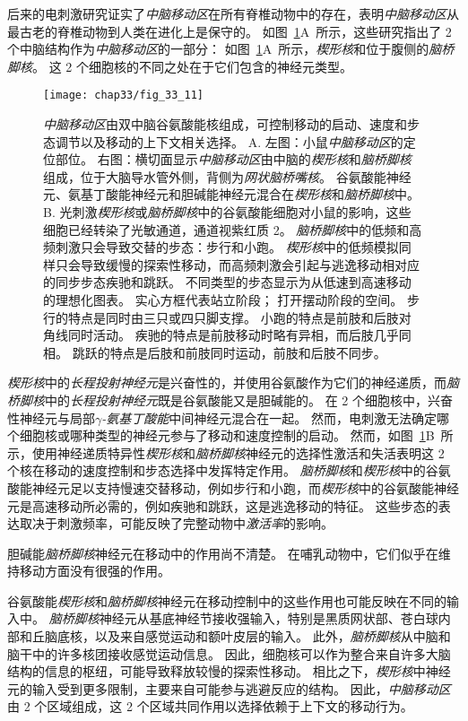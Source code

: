 后来的电刺激研究证实了\textit{中脑移动区}在所有脊椎动物中的存在，表明\textit{中脑移动区}从最古老的脊椎动物到人类在进化上是保守的。
如图~\ref{fig:33_11}A~所示，这些研究指出了 2 个中脑结构作为\textit{中脑移动区}的一部分：
如图~\ref{fig:33_11}A~所示，\textit{楔形核}和位于腹侧的\textit{脑桥脚核}。
这 2 个细胞核的不同之处在于它们包含的神经元类型。


\begin{figure}[htbp]
	\centering
	\texttt{[image: chap33/fig\_33\_11]}
	\caption{\textit{中脑移动区}由双中脑谷氨酸能核组成，可控制移动的启动、速度和步态调节以及移动的上下文相关选择。
		A. 左图：小鼠\textit{中脑移动区}的定位部位。
		右图：横切面显示\textit{中脑移动区}由中脑的\textit{楔形核}和\textit{脑桥脚核}组成，位于大脑导水管外侧，背侧为\textit{网状脑桥嘴核}。
		谷氨酸能神经元、氨基丁酸能神经元和胆碱能神经元混合在\textit{楔形核}和\textit{脑桥脚核}中。
		B. 光刺激\textit{楔形核}或\textit{脑桥脚核}中的谷氨酸能细胞对小鼠的影响，这些细胞已经转染了光敏通道，通道视紫红质 2。
		\textit{脑桥脚核}中的低频和高频刺激只会导致交替的步态：步行和小跑。
		\textit{楔形核}中的低频模拟同样只会导致缓慢的探索性移动，而高频刺激会引起与逃逸移动相对应的同步步态疾驰和跳跃。
		不同类型的步态显示为从低速到高速移动的理想化图表。
		实心方框代表站立阶段；
		打开摆动阶段的空间。
		步行的特点是同时由三只或四只脚支撑。
		小跑的特点是前肢和后肢对角线同时活动。
		疾驰的特点是前肢移动时略有异相，而后肢几乎同相。
		跳跃的特点是后肢和前肢同时运动，前肢和后肢不同步\cite{caggiano2018midbrain}。}
	\label{fig:33_11}
\end{figure}


\textit{楔形核}中的\textit{长程投射神经元}是兴奋性的，并使用谷氨酸作为它们的神经递质，而\textit{脑桥脚核}中的\textit{长程投射神经元}既是谷氨酸能又是胆碱能的。
在 2 个细胞核中，兴奋性神经元与局部\textit{$\gamma$-氨基丁酸能}中间神经元混合在一起。
然而，电刺激无法确定哪个细胞核或哪种类型的神经元参与了移动和速度控制的启动。
然而，如图~\ref{fig:33_11}B~所示，使用神经递质特异性\textit{楔形核}和\textit{脑桥脚核}神经元的选择性激活和失活表明这 2 个核在移动的速度控制和步态选择中发挥特定作用。
\textit{脑桥脚核}和\textit{楔形核}中的谷氨酸能神经元足以支持慢速交替移动，例如步行和小跑，而\textit{楔形核}中的谷氨酸能神经元是高速移动所必需的，例如疾驰和跳跃，这是逃逸移动的特征。
这些步态的表达取决于刺激频率，可能反映了完整动物中\textit{激活率}的影响。


胆碱能\textit{脑桥脚核}神经元在移动中的作用尚不清楚。
在哺乳动物中，它们似乎在维持移动方面没有很强的作用。


谷氨酸能\textit{楔形核}和\textit{脑桥脚核}神经元在移动控制中的这些作用也可能反映在不同的输入中。
\textit{脑桥脚核}神经元从基底神经节接收强输入，特别是黑质网状部、苍白球内部和丘脑底核，以及来自感觉运动和额叶皮层的输入。
此外，\textit{脑桥脚核}从中脑和脑干中的许多核团接收感觉运动信息。
因此，细胞核可以作为整合来自许多大脑结构的信息的枢纽，可能导致释放较慢的探索性移动。
相比之下，\textit{楔形核}中神经元的输入受到更多限制，主要来自可能参与逃避反应的结构。
因此，\textit{中脑移动区}由 2 个区域组成，这 2 个区域共同作用以选择依赖于上下文的移动行为。


